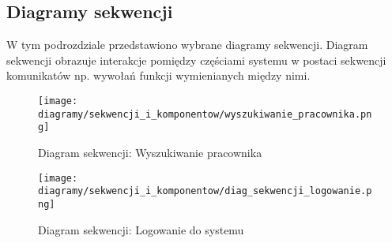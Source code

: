 \subsection{Diagramy sekwencji}
\begin{adjustwidth}{2em}{0pt}

W tym podrozdziale przedstawiono wybrane diagramy sekwencji. Diagram sekwencji obrazuje interakcje pomiędzy częściami systemu w postaci sekwencji komunikatów np. wywołań funkcji wymienianych między nimi. 

\begin{figure}[H]
    \centering
    \texttt{[image: diagramy/sekwencji\_i\_komponentow/wyszukiwanie\_pracownika.png]}
    \caption{Diagram sekwencji: Wyszukiwanie pracownika}
    \label{fig:wyszukiwanie_pracownika}
\end{figure} 

\begin{figure}[H]
    \centering
    \texttt{[image: diagramy/sekwencji\_i\_komponentow/diag\_sekwencji\_logowanie.png]}
    \caption{Diagram sekwencji: Logowanie do systemu}
    \label{fig:diag_sekwencji_logowanie.png}
\end{figure} 

\end{adjustwidth}